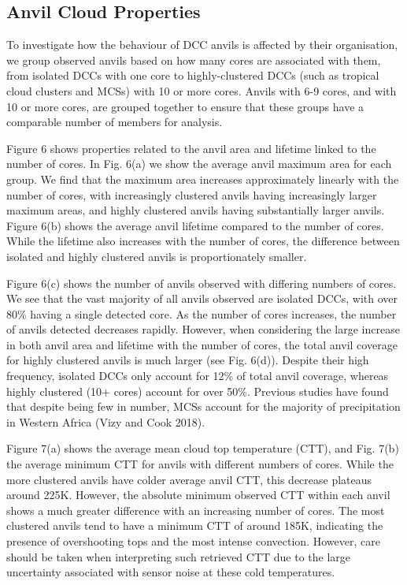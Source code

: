 \subsection{Anvil Cloud Properties}

To investigate how the behaviour of DCC anvils is affected by their
organisation, we group observed anvils based on how many cores are
associated with them, from isolated DCCs with one core to
highly-clustered DCCs (such as tropical cloud clusters and MCSs) with 10
or more cores. Anvils with 6-9 cores, and with 10 or more cores, are
grouped together to ensure that these groups have a comparable number of
members for analysis.

Figure 6 shows properties related to the anvil area and lifetime linked
to the number of cores. In Fig. 6(a) we show the average anvil maximum
area for each group. We find that the maximum area increases
approximately linearly with the number of cores, with increasingly
clustered anvils having increasingly larger maximum areas, and highly
clustered anvils having substantially larger anvils. Figure 6(b) shows
the average anvil lifetime compared to the number of cores. While the
lifetime also increases with the number of cores, the difference between
isolated and highly clustered anvils is proportionately smaller.

Figure 6(c) shows the number of anvils observed with differing numbers
of cores. We see that the vast majority of all anvils observed are
isolated DCCs, with over 80\% having a single detected core. As the
number of cores increases, the number of anvils detected decreases
rapidly. However, when considering the large increase in both anvil area
and lifetime with the number of cores, the total anvil coverage for
highly clustered anvils is much larger (see Fig. 6(d)). Despite their
high frequency, isolated DCCs only account for 12\% of total anvil
coverage, whereas highly clustered (10+ cores) account for over 50\%.
Previous studies have found that despite being few in number, MCSs
account for the majority of precipitation in Western Africa (Vizy and
Cook 2018).

Figure 7(a) shows the average mean cloud top temperature (CTT), and Fig.
7(b) the average minimum CTT for anvils with different numbers of cores.
While the more clustered anvils have colder average anvil CTT, this
decrease plateaus around 225K. However, the absolute minimum observed
CTT within each anvil shows a much greater difference with an increasing
number of cores. The most clustered anvils tend to have a minimum CTT of
around 185K, indicating the presence of overshooting tops and the most
intense convection. However, care should be taken when interpreting such
retrieved CTT due to the large uncertainty associated with sensor noise
at these cold temperatures.

